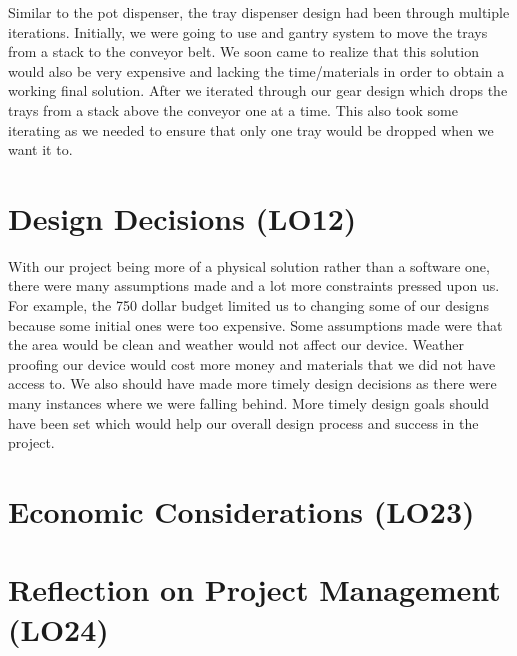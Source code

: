\documentclass{article}
\begin{document}
\noindent Similar to the pot dispenser, the tray dispenser design had been through multiple iterations.
Initially, we were going to use and gantry system to move the trays from a stack to the conveyor belt.
We soon came to realize that this solution would also be very expensive and lacking the time/materials in 
order to obtain a working final solution. After we iterated through our gear design which drops the trays
from a stack above the conveyor one at a time. This also took some iterating as we needed to ensure that only one tray 
would be dropped when we want it to.

\section{Design Decisions (LO12)}

With our project being more of a physical solution rather than a software one, 
there were many assumptions made and a lot more constraints pressed upon us.
For example, the 750 dollar budget limited us to changing some of our designs because some initial ones were too expensive.
Some assumptions made were that the area would be clean and weather would not affect our device.
Weather proofing our device would cost more money and materials that we did not have access to.
We also should have made more timely design decisions as there were many instances where we were falling behind.
More timely design goals should have been set which would help our overall design process and success in the project.

\section{Economic Considerations (LO23)}


\section{Reflection on Project Management (LO24)}

\end{document}
